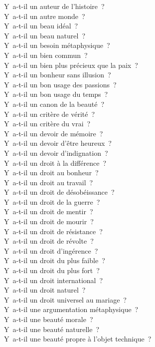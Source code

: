 \documentclass[a4paper,12pt]{article}
\begin{document}
Y a-t-il un auteur de l'histoire ? \\
Y a-t-il un autre monde ? \\
Y a-t-il un beau idéal ? \\
Y a-t-il un beau naturel ? \\
Y a-t-il un besoin métaphysique ? \\
Y a-t-il un bien commun ? \\
Y a-t-il un bien plus précieux que la paix ? \\
Y a-t-il un bonheur sans illusion ? \\
Y a-t-il un bon usage des passions ? \\
Y a-t-il un bon usage du temps ? \\
Y a-t-il un canon de la beauté ? \\
Y a-t-il un critère de vérité ? \\
Y a-t-il un critère du vrai ? \\
Y a-t-il un devoir de mémoire ? \\
Y a-t-il un devoir d'être heureux ? \\
Y a-t-il un devoir d'indignation ? \\
Y a-t-il un droit à la différence ? \\
Y a-t-il un droit au bonheur ? \\
Y a-t-il un droit au travail ? \\
Y a-t-il un droit de désobéissance ? \\
Y a-t-il un droit de la guerre ? \\
Y a-t-il un droit de mentir ? \\
Y a-t-il un droit de mourir ? \\
Y a-t-il un droit de résistance ? \\
Y a-t-il un droit de révolte ? \\
Y a-t-il un droit d'ingérence ? \\
Y a-t-il un droit du plus faible ? \\
Y a-t-il un droit du plus fort ? \\
Y a-t-il un droit international ? \\
Y a-t-il un droit naturel ? \\
Y a-t-il un droit universel au mariage ? \\
Y a-t-il une argumentation métaphysique ? \\
Y a-t-il une beauté morale ? \\
Y a-t-il une beauté naturelle ? \\
Y a-t-il une beauté propre à l'objet technique ? \\
\end{document}
